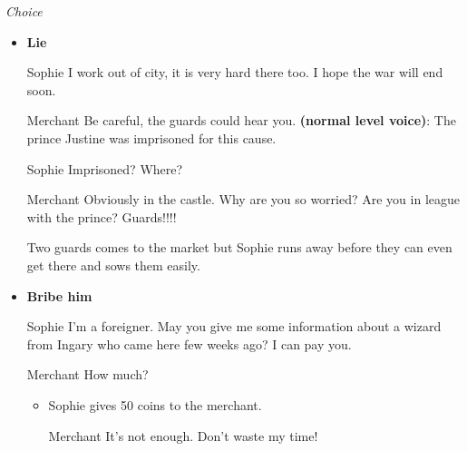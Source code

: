 \textit{Choice}
\begin{itemize}
\item \textbf{Lie}
  
\begin{screenplay}

\begin{dialogue}{Sophie}
I work out of city, it is very hard there too. I hope the war will end soon.
\end{dialogue}
  
\begin{dialogue}{Merchant}
Be careful, the guards could hear you. \textbf{(normal level voice)}: The prince Justine was imprisoned for this cause.
\end{dialogue}
  
\begin{dialogue}[worried]{Sophie}
Imprisoned? Where? 
\end{dialogue}

\begin{dialogue}{Merchant}
Obviously in the castle. Why are you so worried? Are you in league with the prince? Guards!!!!
\end{dialogue}

  Two guards comes to the market but Sophie runs away before they can even get there and sows them easily.

\end{screenplay}
  
\item \textbf{Bribe him}
  
\begin{screenplay}

\begin{dialogue}[persuasive]{Sophie}
I'm a foreigner. May you give me some information about a wizard from Ingary who came here few weeks ago? I can pay you.
\end{dialogue}
  
\begin{dialogue}{Merchant}
How much?
\end{dialogue}

\end{screenplay}
  
  \begin{itemize}
  \item Sophie gives 50 coins to the merchant.

\begin{screenplay}

\begin{dialogue}[annoyed]{Merchant}
It’s not enough. Don’t waste my time!\\
\end{dialogue}


\end{screenplay}
\end{itemize}
\end{itemize}
